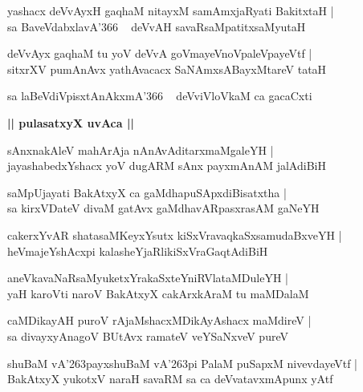 \documentclass[twoside,12pt,openright]{book}
\def\S{\char'263}
\newcounter{shloka}[chapter]
\def\uvaca#1{\centerline{{\large\textbf{#1}}}}
\begin{document}
\begin{shloka}%
yashacx deVvAyxH gaqhaM nitayxM samAmxjaRyati BakitxtaH |\\
sa BaveVdabxlavA\char'366 ~ deVvAH savaRsaMpatitxsaMyutaH 
\end{shloka}

\begin{shloka}%
deVvAyx gaqhaM tu yoV deVvA goVmayeVnoVpaleVpayeVtf |\\
sitxrXV pumAnAvx yathAvacacx SaNAmxsABayxMtareV tataH 
\end{shloka}

\begin{shloka}%
sa laBeVdiVpisxtAnAkxmA\char'366 ~ deVviVloVkaM ca gacaCxti 
\end{shloka}

\uvaca{|| pulasatxyX uvAca ||}

\begin{shloka}%
sAnxnakAleV mahArAja nAnAvAditarxmaMgaleYH |\\
jayashabedxYshacx yoV dugARM sAnx payxmAnAM jalAdiBiH 
\end{shloka}

\begin{shloka}%
saMpUjayati BakAtxyX ca gaMdhapuSApxdiBisatxtha |\\
sa kirxVDateV divaM gatAvx gaMdhavARpasxrasAM gaNeYH 
\end{shloka}

\begin{shloka}%
cakerxYvAR shatasaMKeyxYsutx kiSxVravaqkaSxsamudaBxveYH |\\
heVmajeYshAcxpi kalasheYjaRlikiSxVraGaqtAdiBiH 
\end{shloka}

\begin{shloka}%
aneVkavaNaRsaMyuketxYrakaSxteYniRVlataMDuleYH |\\
yaH karoVti naroV BakAtxyX cakArxkAraM tu maMDalaM 
\end{shloka}

\begin{shloka}%
caMDikayAH puroV rAjaMshacxMDikAyAshacx maMdireV |\\
sa divayxyAnagoV BUtAvx ramateV veYSaNxveV pureV 
\end{shloka}

\begin{shloka}%
shuBaM vA\S payxshuBaM vA\S pi PalaM puSapxM nivevdayeVtf |\\
BakAtxyX yukotxV naraH savaRM sa ca deVvatavxmApunx yAtf
\end{shloka}
\end{document}
